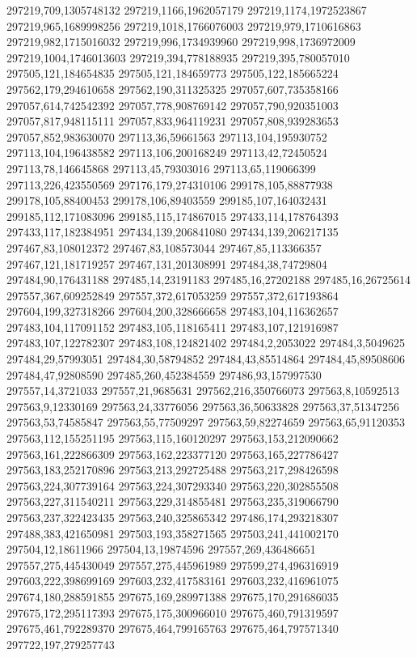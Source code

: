 297219,709,1305748132
297219,1166,1962057179
297219,1174,1972523867
297219,965,1689998256
297219,1018,1766076003
297219,979,1710616863
297219,982,1715016032
297219,996,1734939960
297219,998,1736972009
297219,1004,1746013603
297219,394,778188935
297219,395,780057010
297505,121,184654835
297505,121,184659773
297505,122,185665224
297562,179,294610658
297562,190,311325325
297057,607,735358166
297057,614,742542392
297057,778,908769142
297057,790,920351003
297057,817,948115111
297057,833,964119231
297057,808,939283653
297057,852,983630070
297113,36,59661563
297113,104,195930752
297113,104,196438582
297113,106,200168249
297113,42,72450524
297113,78,146645868
297113,45,79303016
297113,65,119066399
297113,226,423550569
297176,179,274310106
299178,105,88877938
299178,105,88400453
299178,106,89403559
299185,107,164032431
299185,112,171083096
299185,115,174867015
297433,114,178764393
297433,117,182384951
297434,139,206841080
297434,139,206217135
297467,83,108012372
297467,83,108573044
297467,85,113366357
297467,121,181719257
297467,131,201308991
297484,38,74729804
297484,90,176431188
297485,14,23191183
297485,16,27202188
297485,16,26725614
297557,367,609252849
297557,372,617053259
297557,372,617193864
297604,199,327318266
297604,200,328666658
297483,104,116362657
297483,104,117091152
297483,105,118165411
297483,107,121916987
297483,107,122782307
297483,108,124821402
297484,2,2053022
297484,3,5049625
297484,29,57993051
297484,30,58794852
297484,43,85514864
297484,45,89508606
297484,47,92808590
297485,260,452384559
297486,93,157997530
297557,14,3721033
297557,21,9685631
297562,216,350766073
297563,8,10592513
297563,9,12330169
297563,24,33776056
297563,36,50633828
297563,37,51347256
297563,53,74585847
297563,55,77509297
297563,59,82274659
297563,65,91120353
297563,112,155251195
297563,115,160120297
297563,153,212090662
297563,161,222866309
297563,162,223377120
297563,165,227786427
297563,183,252170896
297563,213,292725488
297563,217,298426598
297563,224,307739164
297563,224,307293340
297563,220,302855508
297563,227,311540211
297563,229,314855481
297563,235,319066790
297563,237,322423435
297563,240,325865342
297486,174,293218307
297488,383,421650981
297503,193,358271565
297503,241,441002170
297504,12,18611966
297504,13,19874596
297557,269,436486651
297557,275,445430049
297557,275,445961989
297599,274,496316919
297603,222,398699169
297603,232,417583161
297603,232,416961075
297674,180,288591855
297675,169,289971388
297675,170,291686035
297675,172,295117393
297675,175,300966010
297675,460,791319597
297675,461,792289370
297675,464,799165763
297675,464,797571340
297722,197,279257743
